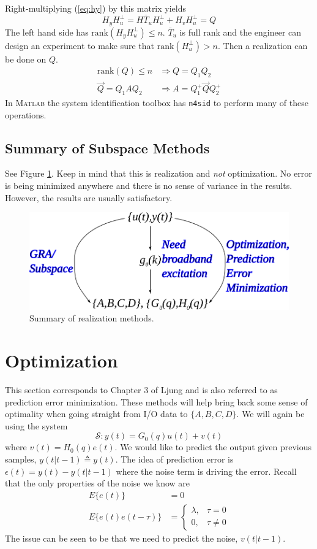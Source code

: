 \documentclass[lecture,12pt,]{pcms-l}
\begin{document}
Right-multiplying (\ref{eq:hy}) by this matrix yields
$$H_yH_u^\perp = H\overline{T}_uH_u^\perp + H_vH_u^\perp = Q$$
The left hand side has $\text{rank}(H_yH_u^\perp)\leq n$. $\overline{T}_u$ is full rank and the engineer can design an experiment to make sure that $\text{rank}(H_u^\perp)>n$. Then a realization can be done on $Q$.
\begin{align*}
\text{rank}(Q) \leq n &\Rightarrow Q=Q_1Q_2 \\
\vec{Q} = Q_1AQ_2 &\Rightarrow A=Q_1^+\vec{Q}Q_2^+
\end{align*}
In \textsc{Matlab} the system identification toolbox has \texttt{n4sid} to perform many of these operations.

\subsection{Summary of Subspace Methods}
See Figure \ref{fig:11realization}. Keep in mind that this is realization and \textit{not} optimization. No error is being minimized anywhere and there is no sense of variance in the results. However, the results are usually satisfactory.

\begin{figure}[ht!]
	\centering
	\includegraphics[width=.6\textwidth]{images/11realization}
	\caption{Summary of realization methods.}
	\label{fig:11realization}
\end{figure}

\section{Optimization}
This section corresponds to Chapter 3 of Ljung and is also referred to as prediction error minimization. These methods will help bring back some sense of optimality when going straight from I/O data to $\{A,B,C,D\}$. We will again be using the system
$$\mathcal{S}: y(t) = G_0(q)u(t)+v(t)$$
where $v(t) = H_0(q)e(t)$. We would like to predict the output given previous samples, $y(t|t-1)\triangleq y(t)$. The idea of prediction error is $\epsilon(t)=y(t)-y(t|t-1)$ where the noise term is driving the error. Recall that the only properties of the noise we know are
\begin{align*}
E\{e(t)\} &= 0 \\
E\{e(t)e(t-\tau)\} &= \begin{cases} \lambda, & \tau=0 \\ 0, & \tau\neq0 \end{cases}
\end{align*}
The issue can be seen to be that we need to predict the noise, $v(t|t-1)$.
\end{document}
